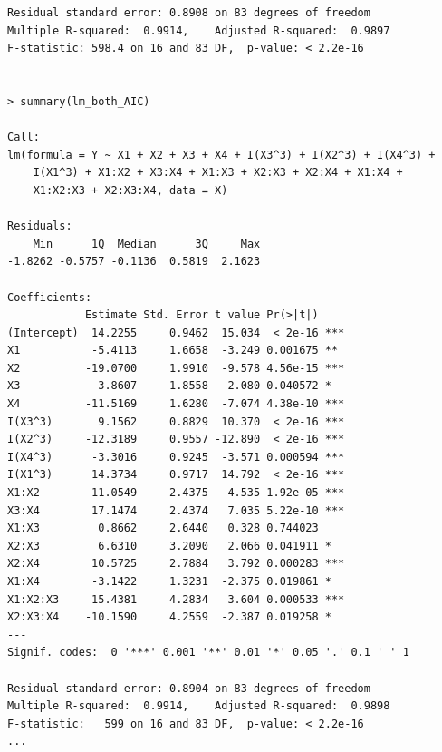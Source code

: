 \begin{lstlisting}[style=output,basicstyle=\tiny]
Residual standard error: 0.8908 on 83 degrees of freedom
Multiple R-squared:  0.9914,	Adjusted R-squared:  0.9897 
F-statistic: 598.4 on 16 and 83 DF,  p-value: < 2.2e-16


> summary(lm_both_AIC)

Call:
lm(formula = Y ~ X1 + X2 + X3 + X4 + I(X3^3) + I(X2^3) + I(X4^3) + 
    I(X1^3) + X1:X2 + X3:X4 + X1:X3 + X2:X3 + X2:X4 + X1:X4 + 
    X1:X2:X3 + X2:X3:X4, data = X)

Residuals:
    Min      1Q  Median      3Q     Max 
-1.8262 -0.5757 -0.1136  0.5819  2.1623 

Coefficients:
            Estimate Std. Error t value Pr(>|t|)    
(Intercept)  14.2255     0.9462  15.034  < 2e-16 ***
X1           -5.4113     1.6658  -3.249 0.001675 ** 
X2          -19.0700     1.9910  -9.578 4.56e-15 ***
X3           -3.8607     1.8558  -2.080 0.040572 *  
X4          -11.5169     1.6280  -7.074 4.38e-10 ***
I(X3^3)       9.1562     0.8829  10.370  < 2e-16 ***
I(X2^3)     -12.3189     0.9557 -12.890  < 2e-16 ***
I(X4^3)      -3.3016     0.9245  -3.571 0.000594 ***
I(X1^3)      14.3734     0.9717  14.792  < 2e-16 ***
X1:X2        11.0549     2.4375   4.535 1.92e-05 ***
X3:X4        17.1474     2.4374   7.035 5.22e-10 ***
X1:X3         0.8662     2.6440   0.328 0.744023    
X2:X3         6.6310     3.2090   2.066 0.041911 *  
X2:X4        10.5725     2.7884   3.792 0.000283 ***
X1:X4        -3.1422     1.3231  -2.375 0.019861 *  
X1:X2:X3     15.4381     4.2834   3.604 0.000533 ***
X2:X3:X4    -10.1590     4.2559  -2.387 0.019258 *  
---
Signif. codes:  0 '***' 0.001 '**' 0.01 '*' 0.05 '.' 0.1 ' ' 1

Residual standard error: 0.8904 on 83 degrees of freedom
Multiple R-squared:  0.9914,	Adjusted R-squared:  0.9898 
F-statistic:   599 on 16 and 83 DF,  p-value: < 2.2e-16
...
\end{lstlisting}

